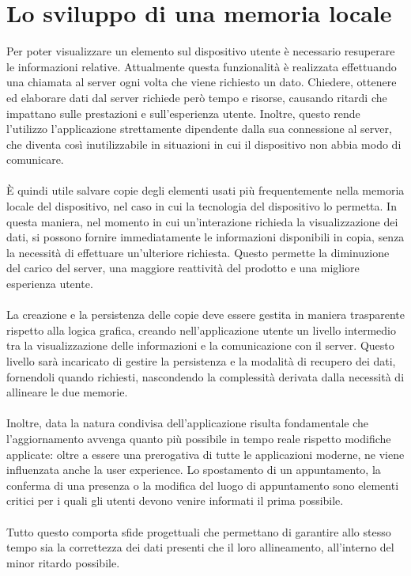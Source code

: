 
\section{Lo sviluppo di una memoria locale}

Per poter visualizzare un elemento sul dispositivo utente
è necessario resuperare le informazioni relative.
Attualmente questa funzionalità è realizzata effettuando una chiamata al server
ogni volta che viene richiesto un dato.
Chiedere, ottenere ed elaborare dati dal server richiede però tempo e risorse,
causando ritardi che impattano sulle prestazioni e sull'esperienza utente.
Inoltre, questo rende l'utilizzo l'applicazione strettamente dipendente dalla sua connessione al server,
che diventa così inutilizzabile in situazioni in cui il dispositivo non abbia modo di comunicare.\\
\\
È quindi utile salvare copie degli elementi usati più frequentemente 
nella memoria locale del dispositivo,
nel caso in cui la tecnologia del dispositivo lo permetta.
In questa maniera, nel momento in cui un'interazione richieda la visualizzazione dei dati, 
si possono fornire immediatamente le informazioni disponibili in copia, 
senza la necessità di effettuare un'ulteriore richiesta.
Questo permette la diminuzione del carico del server, 
una maggiore reattività del prodotto e una migliore esperienza utente.\\
\\
La creazione e la persistenza delle copie deve essere gestita 
in maniera trasparente rispetto alla logica grafica, 
creando nell'applicazione utente un livello intermedio tra 
la visualizzazione delle informazioni e la comunicazione con il server.
Questo livello sarà incaricato di gestire la persistenza e la modalità di recupero dei dati,
fornendoli quando richiesti, 
nascondendo la complessità derivata dalla necessità di allineare le due memorie.\\
\\
Inoltre, data la natura condivisa dell'applicazione risulta fondamentale 
che l'aggiornamento avvenga quanto più possibile in tempo reale rispetto modifiche applicate:
oltre a essere una prerogativa di tutte le applicazioni moderne, 
ne viene influenzata anche la user experience. 
Lo spostamento di un appuntamento, 
la conferma di una presenza o la modifica del luogo di appuntamento 
sono elementi critici per i quali gli utenti devono venire informati il prima possibile. \\
\\
Tutto questo comporta sfide progettuali che permettano di garantire allo stesso tempo 
sia la correttezza dei dati presenti che il loro allineamento,
all'interno del minor ritardo possibile.
\clearpage
